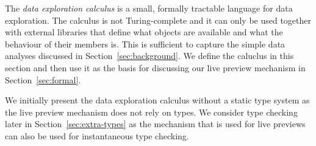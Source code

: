 \documentclass[acmsmall,anonymous,fleqn]{acmart}\settopmatter{printfolios=false,printccs=false,printacmref=false}
\theoremstyle{plain}
\theoremstyle{definition}
\begin{document}
The \emph{data exploration calculus} is a small, formally tractable language for data exploration.
The calculus is not Turing-complete and it can only be used together with external libraries that
define what objects are available and what the behaviour of their members is. This is
sufficient to capture the simple data analyses discussed in Section~\ref{sec:background}. We
define the caluclus in this section and then use it as the basis for discussing our live preview
mechanism in Section~\ref{sec:formal}.

We initially present the data exploration calculus without a static type system as the live preview
mechanism does not rely on types. We consider type checking later in Section~\ref{sec:extra-types}
as the mechanism that is used for live previews can also be used for instantaneous type checking.

\end{document}
